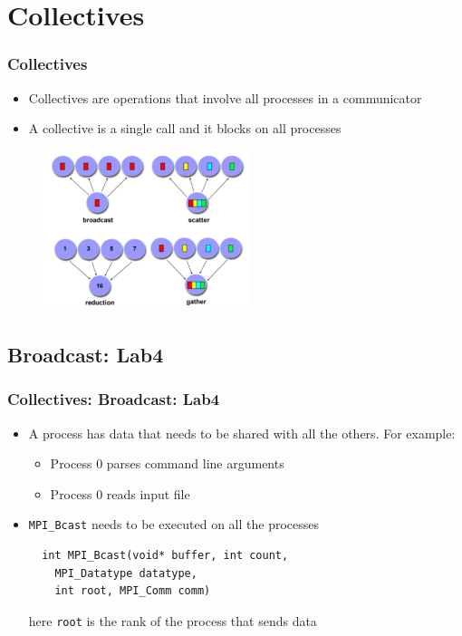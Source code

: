 \documentclass{beamer}
\begin{document}
\section{Collectives}

\begin{frame}[fragile]
  \frametitle{Collectives}
\begin{itemize}
\item Collectives are operations that involve all processes in a communicator
\item A collective is a single call and it blocks on all processes
\end{itemize}
 \begin{figure}[h]
\includegraphics[width=6.0cm]{graphs/collectives.png}
 \end{figure}

\end{frame}


\subsection{Broadcast: Lab4}
\begin{frame}[fragile]
  \frametitle{Collectives: Broadcast: Lab4}
\begin{itemize}
\item A process has data that needs to be shared with all the others. For example:
\begin{itemize}
\item Process 0 parses command line arguments
\item Process 0 reads input file
\end{itemize}
\item {\color{mycolorcode}\verb|MPI_Bcast|} needs to be executed on all the processes
{\color{mycolorcode}
\begin{verbatim}
  int MPI_Bcast(void* buffer, int count, 
    MPI_Datatype datatype, 
    int root, MPI_Comm comm)
\end{verbatim}
}
here {\color{mycolorcode}\verb|root|} is the rank of the process that sends data
\end{itemize}
\end{frame}
\end{document}
